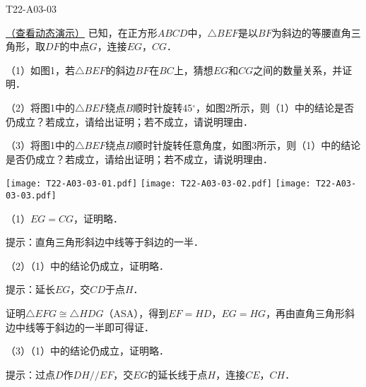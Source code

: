\begin{defproblem}{T22-A03-03}%
\begin{onlyproblem}%
\href{run:./ItemBankFigures/T22-A03-03.ggb}{（查看动态演示）}
已知，在正方形$ABCD$中，$\triangle BEF$是以$BF$为斜边的等腰直角三角形，取$DF$的中点$G$，连接$EG$，$CG$．

（1）如图1，若$\triangle BEF$的斜边$BF$在$BC$上，猜想$EG$和$CG$之间的数量关系，并证明．

（2）将图1中的$\triangle BEF$绕点$B$顺时针旋转45$^{\circ }$，如图2所示，则（1）中的结论是否仍成立？若成立，请给出证明；若不成立，请说明理由．

（3）将图1中的$\triangle BEF$绕点$B$顺时针旋转任意角度，如图3所示，则（1）中的结论是否仍成立？若成立，请给出证明；若不成立，请说明理由．


\begin{center}
\texttt{[image: T22-A03-03-01.pdf]}\qquad
\texttt{[image: T22-A03-03-02.pdf]}\qquad
\texttt{[image: T22-A03-03-03.pdf]}
\end{center}



\end{onlyproblem}%
\begin{onlysolution}%
（1）$EG=CG$，证明略．

提示：直角三角形斜边中线等于斜边的一半．

（2）（1）中的结论仍成立，证明略．

提示：延长$EG$，交$CD$于点$H$．

证明$\triangle EFG\cong \triangle HDG$（ASA），得到$EF=HD$，$EG=HG$，再由直角三角形斜边中线等于斜边的一半即可得证．

（3）（1）中的结论仍成立，证明略．

提示：过点$D$作$DH//EF$，交$EG$的延长线于点$H$，连接$CE$，$CH$．

\begin{center}
\end{center}
\end{onlysolution}%
\end{defproblem}
